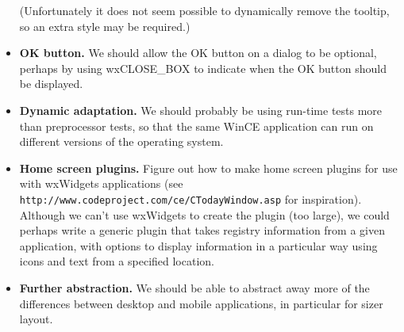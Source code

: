 \begin{itemize}
(Unfortunately it does not seem possible to dynamically remove the tooltip, so an extra style may
be required.)
\item {\bf OK button.} We should allow the OK button on a dialog to be optional, perhaps
by using wxCLOSE\_BOX to indicate when the OK button should be displayed.
\item {\bf Dynamic adaptation.} We should probably be using run-time tests more
than preprocessor tests, so that the same WinCE application can run on different
versions of the operating system.
\item {\bf Home screen plugins.} Figure out how to make home screen plugins for use with wxWidgets
applications (see {\tt http://www.codeproject.com/ce/CTodayWindow.asp} for inspiration).
Although we can't use wxWidgets to create the plugin (too large), we could perhaps write
a generic plugin that takes registry information from a given application, with
options to display information in a particular way using icons and text from
a specified location.
\item {\bf Further abstraction.} We should be able to abstract away more of the differences
between desktop and mobile applications, in particular for sizer layout.
\end{itemize}

